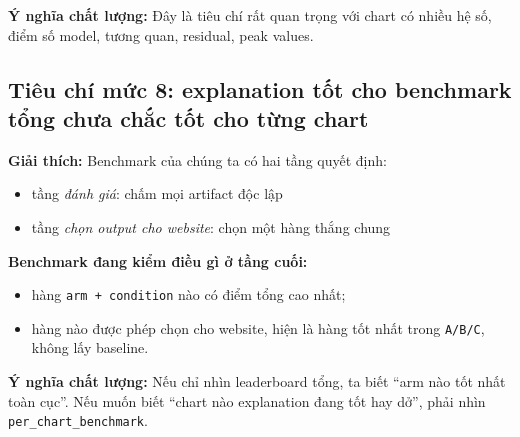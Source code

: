 \documentclass[11pt,a4paper]{article}
\newcommand{\field}[1]{\texttt{#1}}
\begin{document}
\textbf{Ý nghĩa chất lượng:}
Đây là tiêu chí rất quan trọng với chart có nhiều hệ số, điểm số model, tương quan, residual, peak values.

\subsection{Tiêu chí mức 8: explanation tốt cho benchmark tổng chưa chắc tốt cho từng chart}
\textbf{Giải thích:}
Benchmark của chúng ta có hai tầng quyết định:
\begin{itemize}
  \item tầng \emph{đánh giá}: chấm mọi artifact độc lập
  \item tầng \emph{chọn output cho website}: chọn một hàng thắng chung
\end{itemize}

\textbf{Benchmark đang kiểm điều gì ở tầng cuối:}
\begin{itemize}
  \item hàng \field{arm + condition} nào có điểm tổng cao nhất;
  \item hàng nào được phép chọn cho website, hiện là hàng tốt nhất trong \field{A/B/C}, không lấy baseline.
\end{itemize}

\textbf{Ý nghĩa chất lượng:}
Nếu chỉ nhìn leaderboard tổng, ta biết ``arm nào tốt nhất toàn cục''.
Nếu muốn biết ``chart nào explanation đang tốt hay dở'', phải nhìn \field{per\_chart\_benchmark}.
\end{document}
